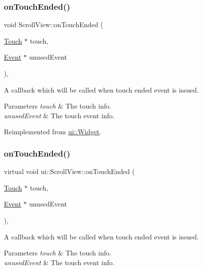 \subsubsection{\texorpdfstring{on\+Touch\+Ended()}{onTouchEnded()}\hspace{0.1cm}{\footnotesize\ttfamily [1/2]}}
{\footnotesize\ttfamily void Scroll\+View\+::on\+Touch\+Ended (\begin{DoxyParamCaption}\item[{\hyperlink{classTouch}{Touch} $\ast$}]{touch,  }\item[{\hyperlink{classEvent}{Event} $\ast$}]{unused\+Event }\end{DoxyParamCaption})\hspace{0.3cm}{\ttfamily [override]}, {\ttfamily [virtual]}}

A callback which will be called when touch ended event is issued. 
\begin{DoxyParams}{Parameters}
{\em touch} & The touch info. \\
\hline
{\em unused\+Event} & The touch event info. \\
\hline
\end{DoxyParams}


Reimplemented from \hyperlink{classui_1_1Widget_ac4d1576dfe1f3cf0a509f2d2ca0c5b90}{ui\+::\+Widget}.

\mbox{\label{classui_1_1ScrollView_a3bb1022184ffae6a9fc2e4f0668cddab}} 
\subsubsection{\texorpdfstring{on\+Touch\+Ended()}{onTouchEnded()}\hspace{0.1cm}{\footnotesize\ttfamily [2/2]}}
{\footnotesize\ttfamily virtual void ui\+::\+Scroll\+View\+::on\+Touch\+Ended (\begin{DoxyParamCaption}\item[{\hyperlink{classTouch}{Touch} $\ast$}]{touch,  }\item[{\hyperlink{classEvent}{Event} $\ast$}]{unused\+Event }\end{DoxyParamCaption})\hspace{0.3cm}{\ttfamily [override]}, {\ttfamily [virtual]}}

A callback which will be called when touch ended event is issued. 
\begin{DoxyParams}{Parameters}
{\em touch} & The touch info. \\
\hline
{\em unused\+Event} & The touch event info. \\
\hline
\end{DoxyParams}


